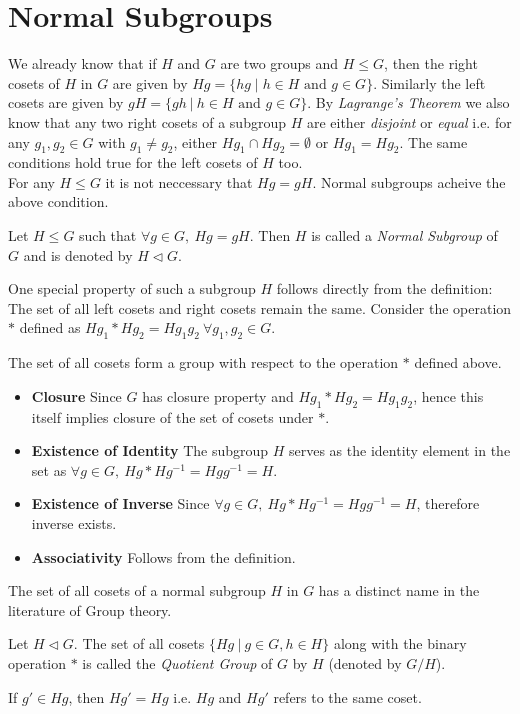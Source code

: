 \section{Normal Subgroups}
We already know that if $H$ and $G$ are two groups and $H\leq G$, then the right cosets of $H$ in $G$ are given by $Hg = \{hg\mid h\in H\text{ and }g\in G\}$. Similarly the left cosets are given by $gH = \{gh~|~h\in H\text{ and }g\in G\}$. By \emph{Lagrange's Theorem} we also know that any two right cosets of a subgroup $H$ are either \emph{disjoint} or \emph{equal} i.e. for any $g_1,g_2\in G$ with $g_1\neq g_2$, either $Hg_1\cap Hg_2 = \emptyset$ or $Hg_1 = Hg_2$. The same conditions hold true for the left cosets of $H$ too.\\
For any $H\leq G$ it is not neccessary that $Hg = gH$.  Normal subgroups acheive the above condition. 
\begin{definition}
	Let $H\leq G$ such that $\forall g\in G,~Hg = gH.$ Then $H$ is called a {\em Normal Subgroup} of $G$ and is denoted by $H\triangleleft G$.
\end{definition}
One special property of such a subgroup $H$ follows directly from the definition: The set of all left cosets and right cosets remain the same. Consider the operation $*$ defined as $Hg_1*Hg_2 = Hg_1g_2~\forall g_1,g_2\in G$.
\begin{observation}
The set of all cosets form a group with respect to the operation $*$ defined above.
\begin{itemize}
	\item {\bf Closure} Since $G$ has closure property and $Hg_1*Hg_2 = Hg_1g_2$, hence this itself implies closure of the set of cosets under $*$.
	\item {\bf Existence of Identity} The subgroup $H$ serves as the identity element in the set as $\forall g\in G,~Hg*Hg^{-1} = Hgg^{-1}=H$.
	\item {\bf Existence of Inverse} Since $\forall g\in G,~Hg*Hg^{-1} = Hgg^{-1} = H$, therefore inverse exists.
	\item {\bf Associativity} Follows from the definition.
\end{itemize}
\end{observation}
The set of all cosets of a normal subgroup $H$ in $G$ has a distinct name in the literature of Group theory. 
\begin{definition}\label{QG}
	Let $H\triangleleft G$. The set of all cosets $\{Hg~|~g\in G, h\in H\}$ along with the binary operation $*$ is called the {\em Quotient Group} of $G$ by $H$ (denoted by $G/H$).
\end{definition}
If $g'\in Hg$, then $Hg' = Hg$ i.e. $Hg$ and $Hg'$ refers to the same coset. 

